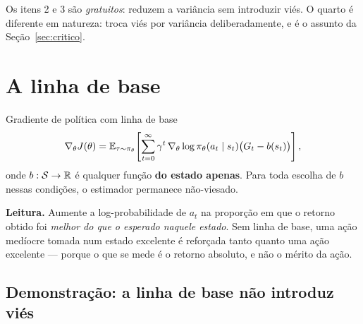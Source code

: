 \documentclass[11pt, a4paper]{article}
\begin{document}
Os itens 2 e 3 são \emph{gratuitos}: reduzem a variância sem introduzir viés.
O quarto é diferente em natureza: troca viés por variância deliberadamente, e é
o assunto da Seção~\ref{sec:critico}.

\section{A linha de base}

\begin{defbox}{Gradiente de política com linha de base}
\[
  \nabla_\theta J(\theta) = \mathbb{E}_{\tau\sim\pi_\theta}\!\left[
    \sum_{t=0}^{\infty} \gamma^t\,\nabla_\theta \log \pi_\theta(a_t \mid s_t)
    \big(G_t - b(s_t)\big)\right],
\]
onde $b:\mathcal{S}\to\mathbb{R}$ é qualquer função \textbf{do estado apenas}. Para toda escolha de $b$
nessas condições, o estimador permanece não-viesado.
\end{defbox}

\begin{ideiabox}
\textbf{Leitura.} Aumente a log-probabilidade de $a_t$ na proporção em que o
retorno obtido foi \emph{melhor do que o esperado naquele estado}. Sem linha de
base, uma ação medíocre tomada num estado excelente é reforçada tanto quanto
uma ação excelente --- porque o que se mede é o retorno absoluto, e não o
mérito da ação.
\end{ideiabox}

\subsection{Demonstração: a linha de base não introduz viés}
\end{document}
